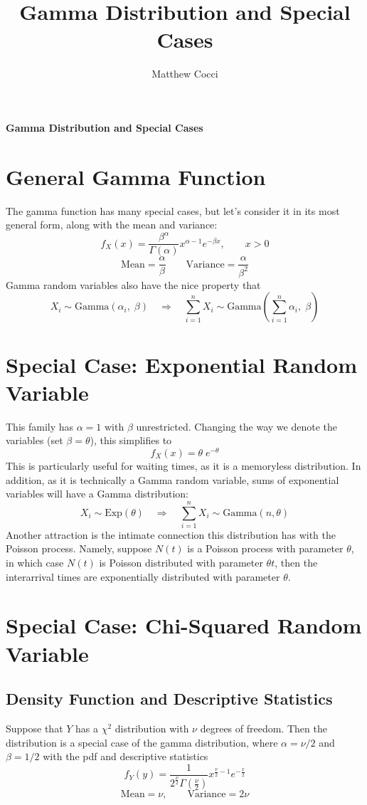 \documentclass[a4paper,12pt]{scrartcl}
\author{Matthew Cocci}
\title{Gamma Distribution and Special Cases}
\date{}
\begin{document}
\begin{center}
   \LARGE
   \textbf{Gamma Distribution and Special Cases}
\end{center}
\section{General Gamma Function}

The gamma function has many special cases, but let's consider it 
in its most general form, along with the mean and variance:
\begin{equation}
   f_X(x) = \frac{\beta^\alpha}{\Gamma(\alpha)} x^{\alpha-1}
      e^{-\beta x}, \qquad x > 0
\end{equation}
\[ \text{Mean} = \frac{\alpha}{\beta} \qquad \text{Variance} = 
   \frac{\alpha}{\beta^2} \]
Gamma random variables also have the nice property that
\[ X_i \sim \text{Gamma}(\alpha_i, \;\beta) \quad \Rightarrow \quad
   \sum^n_{i=1} X_i \sim \text{Gamma}\left(\sum^n_{i=1} \alpha_i,\;\beta
   \right) \]

\section{Special Case: Exponential Random Variable}

This family has $\alpha=1$ with $\beta$ unrestricted. Changing the way
we denote the variables (set $\beta =\theta$), this simplifies to
   \[ f_X(x) = \theta\; e^{-\theta} \]
This is particularly useful for waiting times, as it is a memoryless
distribution. In addition, as it is technically a Gamma random
variable, sums of exponential variables will have a Gamma distribution:
\[ X_i \sim \text{Exp}(\theta) \quad \Rightarrow \quad 
   \sum^n_{i=1} X_i \sim \text{Gamma}(n, \theta) \]
Another attraction is the intimate connection this distribution has
with the Poisson process.  Namely, suppose $N(t)$ is a Poisson process
with parameter $\theta$, in which case $N(t)$ is Poisson distributed
with parameter $\theta t$, then the interarrival times are 
exponentially distributed with parameter $\theta$. 


\section{Special Case: Chi-Squared Random Variable}

\subsection{Density Function and Descriptive Statistics}
Suppose that $Y$ has a $\chi^2$ distribution with $\nu$ degrees
of freedom. Then the distribution is a special case of the gamma 
distribution, where $\alpha = \nu/2$ and $\beta = 1/2$ with the pdf
and descriptive statistics
\begin{equation}
   f_Y(y) = \frac{1}{2^{\frac{\nu}{2}} \Gamma\left(\frac{\nu}{2}\right)}
      x^{\frac{\nu}{2} - 1} e^{-\frac{x}{2}}
\end{equation}
   \[ \text{Mean} = \nu, \qquad \text{Variance} = 2 \nu \]
\end{document}
